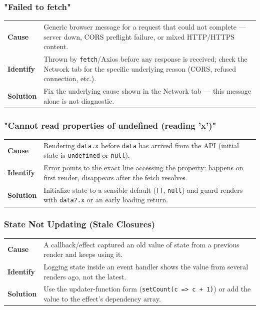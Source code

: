 \subsubsection*{"Failed to fetch"}
\noindent\begin{tabularx}{\textwidth}{@{}>{\bfseries}p{2.3cm}X@{}}
\toprule
Cause & Generic browser message for a request that could not complete ---
server down, CORS preflight failure, or mixed HTTP/HTTPS content. \\
Identify & Thrown by \texttt{fetch}/Axios before any response is received;
check the Network tab for the specific underlying reason (CORS, refused
connection, etc.). \\
Solution & Fix the underlying cause shown in the Network tab --- this
message alone is not diagnostic. \\
\bottomrule
\end{tabularx}

\subsubsection*{"Cannot read properties of undefined (reading 'x')"}
\noindent\begin{tabularx}{\textwidth}{@{}>{\bfseries}p{2.3cm}X@{}}
\toprule
Cause & Rendering \texttt{data.x} before \texttt{data} has arrived from
the API (initial state is \texttt{undefined} or \texttt{null}). \\
Identify & Error points to the exact line accessing the property; happens
on first render, disappears after the fetch resolves. \\
Solution & Initialize state to a sensible default (\texttt{[]}, \texttt{null})
and guard renders with \texttt{data?.x} or an early loading return. \\
\bottomrule
\end{tabularx}

\subsubsection*{State Not Updating (Stale Closures)}
\noindent\begin{tabularx}{\textwidth}{@{}>{\bfseries}p{2.3cm}X@{}}
\toprule
Cause & A callback/effect captured an old value of state from a previous
render and keeps using it. \\
Identify & Logging state inside an event handler shows the value from
several renders ago, not the latest. \\
Solution & Use the updater-function form (\texttt{setCount(c => c + 1)})
or add the value to the effect's dependency array. \\
\bottomrule
\end{tabularx}


